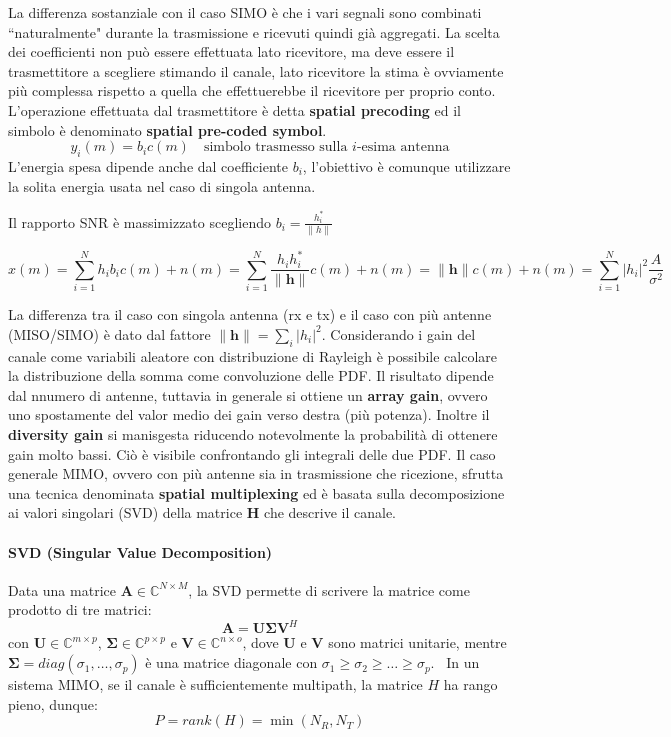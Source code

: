 La differenza sostanziale con il caso SIMO è che i vari segnali sono combinati ``naturalmente" durante la trasmissione e ricevuti quindi già aggregati. 
La scelta dei coefficienti non può essere effettuata lato ricevitore, ma deve essere il trasmettitore a scegliere stimando il canale, lato ricevitore la stima è ovviamente più complessa rispetto a quella che effettuerebbe il ricevitore per proprio conto.
L'operazione effettuata dal trasmettitore è detta \textbf{spatial precoding} ed il simbolo è denominato \textbf{spatial pre-coded symbol}.
\[
    y_i(m) = b_i c(m) \quad \text{simbolo trasmesso sulla $i$-esima antenna}
\]
L'energia spesa dipende anche dal coefficiente $b_i$, l'obiettivo è comunque utilizzare la solita energia usata nel caso di singola antenna.

Il rapporto SNR è massimizzato scegliendo $b_i = \frac{h_i^*}{ \| h \| }$

\[
    x(m) = \sum_{i=1}^{N} h_i b_i c(m) + n(m) = \sum_{i=1}^{N} \frac{h_i h_i^*}{\| \mathbf{h} \|} c(m) + n(m) = \| \mathbf{h} \| c(m) + n(m) = \sum_{i=1}^{N} |h_i|^2 \frac{A}{\sigma^2}
\]

La differenza tra il caso con singola antenna (rx e tx) e il caso con più antenne (MISO/SIMO) è dato dal fattore $\| \mathbf{h} \| = \sum_{i} |h_i|^2$.
Considerando i gain del canale come variabili aleatore con distribuzione di Rayleigh è possibile calcolare la distribuzione della somma come convoluzione delle PDF.
Il risultato dipende dal nnumero di antenne, tuttavia in generale si ottiene un \textbf{array gain}, ovvero uno spostamente del valor medio dei gain verso destra (più potenza). Inoltre il \textbf{diversity gain} si manisgesta riducendo notevolmente la probabilità di ottenere gain molto bassi. Ciò è visibile confrontando gli integrali delle due PDF.
Il caso generale MIMO, ovvero con più antenne sia in trasmissione che ricezione, sfrutta una tecnica denominata \textbf{spatial multiplexing} ed è basata sulla decomposizione ai valori singolari (SVD) della matrice $\mathbf{H}$ che descrive il canale.

\paragraph*{SVD (Singular Value Decomposition)}

Data una matrice $\mathbf{A} \in \mathbb{C}^{N \times M}$, la SVD permette di scrivere la matrice come prodotto di tre matrici:
\[
    \mathbf{A} = \mathbf{U} \mathbf{\Sigma} \mathbf{V}^H
\]
con $\mathbf{U} \in \mathbb{C}^{m \times p}$, $\mathbf{\Sigma} \in \mathbb{C}^{p \times p}$ e $\mathbf{V} \in \mathbb{C}^{n \times o}$,
dove $\mathbf{U}$ e $\mathbf{V}$ sono matrici unitarie, mentre $\mathbf{\Sigma} = diag(\sigma_1, \ldots, \sigma_p)$ è una matrice diagonale con $\sigma_1 \geq \sigma_2 \geq \ldots \geq \sigma_p$. 
\
In un sistema MIMO, se il canale è sufficientemente multipath, la matrice $H$ ha rango pieno, dunque:
\[
    P = rank(H) = \min(N_R, N_T)
\]

